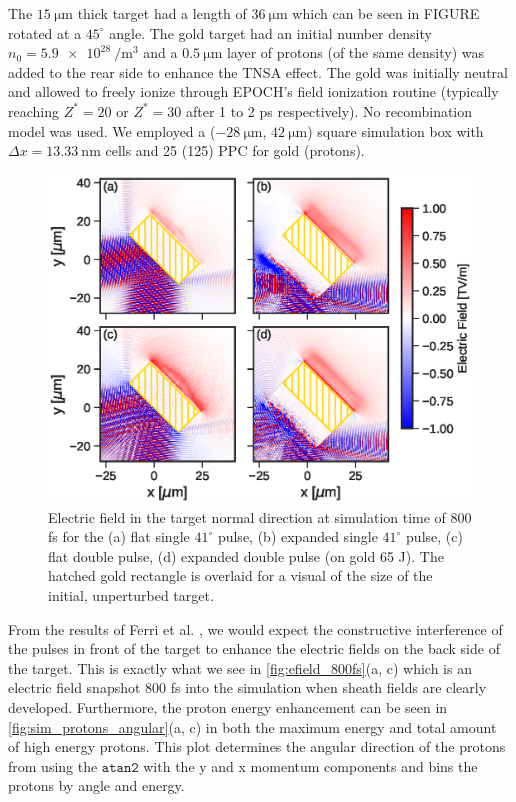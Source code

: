 The $\SI{15}{\micro \meter}$ thick target had a length of $\SI{36}{\micro \meter}$ which can be seen in FIGURE rotated at a $45^\circ$ angle. The gold target had an initial number density $n_0 = \SI{5.9e28}{\per \meter \cubed}$ and a $\SI{0.5}{\micro \meter}$ layer of protons (of the same density) was added to the rear side to enhance the \gls{TNSA} effect.  The gold was initially neutral and allowed to freely ionize through EPOCH's field ionization routine (typically reaching $Z^* = 20$ or $Z^* = 30$ after 1 to 2 ps respectively). No recombination model was used. We employed a ($-\SI{28}{\micro \meter}$, $\SI{42}{\micro \meter}$) square simulation box with $\Delta x = \SI{13.33}{\nano \meter}$ cells and 25 (125) \gls{PPC} for gold (protons).

\begin{figure}
	\centering
	\includegraphics[width=0.9\linewidth]{planning/images/titan/efield_800fs.eps}
	\caption{Electric field in the target normal direction at simulation time of 800 fs for the (a) flat single $41^\circ$ pulse, (b) expanded single $41^\circ$ pulse, (c) flat double pulse, (d) expanded double pulse (on gold 65 J). The hatched gold rectangle is overlaid for a visual of the size of the initial, unperturbed target.}
	\label{fig:efield_800fs}
\end{figure}

From the results of Ferri et al. \cite{Ferri_2019_Nat_Comm}, we would expect the constructive interference of the pulses in front of the target to enhance the electric fields on the back side of the target. This is exactly what we see in \autoref{fig:efield_800fs}(a, c) which is an electric field snapshot 800 fs into the simulation when sheath fields are clearly developed. Furthermore, the proton energy enhancement can be seen in \autoref{fig:sim_protons_angular}(a, c) in both the maximum energy and total amount of high energy protons. This plot determines the angular direction of the protons from using the $\texttt{atan2}$ with the y and x momentum components and bins the protons by angle and energy.

